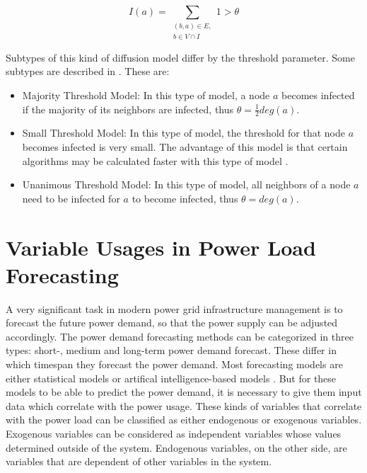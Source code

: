 \begin{equation}
    I(a) = \sum\limits_{\substack{(b,a)\in E, \\ b \in V \cap I}}
    1 > \theta    
    \label{eq:threshold}
\end{equation}

Subtypes of this kind of diffusion model differ by the threshold parameter.
Some subtypes are described in \cite{diffusionbasics}. These are:

\begin{itemize}
    \item Majority Threshold Model: In this type of model, a node $a$ becomes
    infected if the majority of its neighbors are infected, thus 
    $\theta = \frac{1}{2}deg(a)$.
    \item Small Threshold Model: In this type of model, the threshold for that
    node $a$ becomes infected is very small. The advantage of this model is that 
    certain algorithms may be calculated faster with this type of model 
    \cite{diffusionbasics}.
    \item Unanimous Threshold Model: In this type of model, all neighbors 
    of a node $a$ need to be infected for $a$ to become infected, thus
    $\theta = deg(a)$.
\end{itemize}


\section{Variable Usages in Power Load Forecasting}
\label{powerloadsection}

A very significant task in modern power grid infrastructure management 
is to forecast
the future power demand, so that the power supply can be adjusted accordingly.
The power demand forecasting methods can be categorized in three types:
short-, medium and long-term power demand forecast. These differ in which
timespan they forecast the power demand. Most forecasting models are 
either statistical models or artifical intelligence-based models 
\cite{raza2015review}. But for these models to be able to predict the power 
demand, it is necessary to give them input data which correlate with the power 
usage. These kinds of variables that correlate with the power load 
can be classified as either endogenous or exogenous variables.
Exogenous variables can be considered as independent variables 
whose values determined outside of the system. 
Endogenous variables, on the other side, 
are variables that are dependent of other variables in the 
system.

